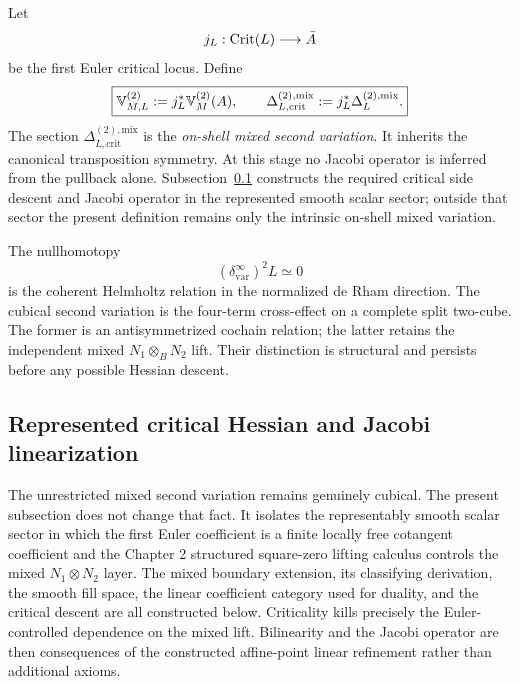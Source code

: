 \begin{definition}
\label{def:var-jacobi}
Let
\[
    j_L:\operatorname{Crit}(L)\longrightarrow\bar A
\]
be the first Euler critical locus. Define
\[
    \boxed{
    \mathbb V^{(2)}_{M,L}
    :=
    j_L^*\mathbb V^{(2)}_M(A),
    \qquad
    \Delta_{L,\mathrm{crit}}^{(2),\mathrm{mix}}
    :=
    j_L^*\Delta_L^{(2),\mathrm{mix}}.
    }
\]
The section \(\Delta_{L,\mathrm{crit}}^{(2),\mathrm{mix}}\) is the \emph{on-shell mixed second variation}. It inherits the canonical transposition symmetry. At this stage no Jacobi operator is inferred from the pullback alone.  Subsection~\ref{subsec:var-represented-jacobi} constructs the required critical side descent and Jacobi operator in the represented smooth scalar sector; outside that sector the present definition remains only the intrinsic on-shell mixed variation.
\end{definition}

\begin{remark}
\label{rem:var-hessian-not-dsquare}
The nullhomotopy
\[
    (\delta^{\infty}_{\mathrm{var}})^2L\simeq0
\]
is the coherent Helmholtz relation in the normalized de Rham direction. The cubical second variation is the four-term cross-effect on a complete split two-cube. The former is an antisymmetrized cochain relation; the latter retains the independent mixed \(N_1\otimes_BN_2\) lift. Their distinction is structural and persists before any possible Hessian descent.
\end{remark}


\subsection{Represented critical Hessian and Jacobi linearization}
\label{subsec:var-represented-jacobi}

The unrestricted mixed second variation remains genuinely cubical.  The present subsection does not change that fact.  It isolates the representably smooth scalar sector in which the first Euler coefficient is a finite locally free cotangent coefficient and the Chapter 2 structured square-zero lifting calculus controls the mixed \(N_1\otimes N_2\) layer.  The mixed boundary extension, its classifying derivation, the smooth fill space, the linear coefficient category used for duality, and the critical descent are all constructed below.  Criticality kills precisely the Euler-controlled dependence on the mixed lift.  Bilinearity and the Jacobi operator are then consequences of the constructed affine-point linear refinement rather than additional axioms.

